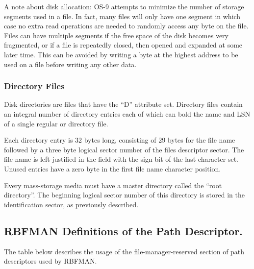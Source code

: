 \documentclass[
]{article}
\begin{document}
A note about disk allocation: OS-9 attempts to minimize the number of
storage segments used in a file. In fact, many files will only have one
segment in which case no extra read operations are needed to randomly
access any byte on the file. Files can have multiple segments if the
free space of the disk becomes very fragmented, or if a file is
repeatedly closed, then opened and expanded at some later time. This can
be avoided by writing a byte at the highest address to be used on a file
before writing any other data.

\subsubsection{Directory Files}

Disk directories are files that have the ``D'' attribute set. Directory
files contain an integral number of directory entries each of which can
bold the name and LSN of a single regular or directory file.

Each directory entry is 32 bytes long, consisting of 29 bytes for the
file name followed by a three byte logical sector number of the
file\textquotesingle s descriptor sector. The file name is
left-justified in the field with the sign bit of the last character set.
Unused entries have a zero byte in the first file name character
position.

Every mass-storage media must have a master directory called the ``root
directory''. The beginning logical sector number of this directory is
stored in the identification sector, as previously described.

\subsection{RBFMAN Definitions of the Path Descriptor.}

The table below describes the usage of the file-manager-reserved section
of path descriptors used by RBFMAN.
\end{document}
